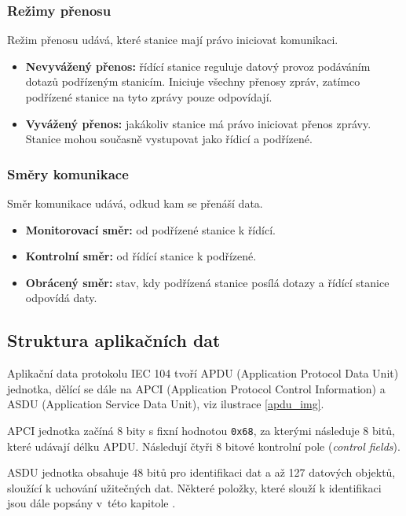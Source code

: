 \pagebreak

\subsubsection*{Režimy přenosu}

Režim přenosu udává, které stanice mají právo iniciovat komunikaci.

\begin{itemize}
    \item \textbf{Nevyvážený přenos:} řídící stanice reguluje datový provoz podáváním dotazů podřízeným stanicím. Iniciuje všechny přenosy zpráv, zatímco podřízené stanice na tyto zprávy pouze odpovídají.
    \item \textbf{Vyvážený přenos:} jakákoliv stanice má právo iniciovat přenos zprávy. Stanice mohou současně vystupovat jako řídicí a podřízené.
\end{itemize}

\subsubsection*{Směry komunikace}

Směr komunikace udává, odkud kam se přenáší data.

\begin{itemize}
    \item \textbf{Monitorovací směr:} od podřízené stanice k řídící.
    \item \textbf{Kontrolní směr:} od řídící stanice k podřízené.
    \item \textbf{Obrácený směr:} stav, kdy podřízená stanice posílá dotazy a řídící stanice odpovídá daty.
\end{itemize}

\subsection{Struktura aplikačních dat}

Aplikační data protokolu IEC 104 tvoří APDU (Application Protocol Data Unit) jednotka, dělící se dále na APCI (Application Protocol Control Information) a ASDU (Application Service Data Unit), viz ilustrace \ref{apdu_img}.

APCI jednotka začíná 8 bity s fixní hodnotou \texttt{0x68}, za kterými následuje 8 bitů, které udávají délku APDU. Následují čtyři 8 bitové kontrolní pole (\emph{control fields}). 

ASDU jednotka obsahuje 48 bitů pro identifikaci dat a až 127 datových objektů, sloužící k uchování užitečných dat. Některé položky, které slouží k identifikaci jsou dále popsány v~této kapitole  \cite{iec_104}.

